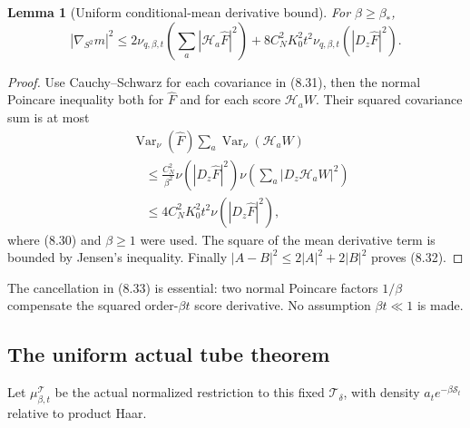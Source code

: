 \documentclass[11pt,oneside]{article}
\newtheorem{lemma}[theorem]{Lemma}
\DeclareMathOperator{\Var}{Var}
\newcommand{\cS}{\mathcal S}
\newcommand{\cT}{\mathcal T}
\begin{document}
\begin{lemma}[Uniform conditional-mean derivative bound]
\label{lem:f13v3-mean}
For \(\beta\ge\beta_*\),
\[
 |\nabla_{S^2}m|^2
 \le 2\nu_{q,\beta,t}
                  \left(\sum_a|\mathcal H_a\widehat F|^2\right)
       +8C_N^2K_0^2t^2
                    \nu_{q,\beta,t}(|D_z\widehat F|^2).
 \tag{8.32}
\]
\end{lemma}
\begin{proof}
Use Cauchy--Schwarz for each
covariance in (8.31), then
the normal Poincare inequality
both for \(\widehat F\) and
for each score \(\mathcal H_aW\).
Their squared covariance sum
is at most
\[
 \begin{split}
 &\Var_\nu(\widehat F)\sum_a
                           \Var_\nu(\mathcal H_aW)\\
 &\quad\le
 \frac{C_N^2}{\beta^2}
       \nu(|D_z\widehat F|^2)
             \nu\!\left(\sum_a|D_z\mathcal H_aW|^2\right)\\
 &\quad\le
       4C_N^2K_0^2t^2\nu(|D_z\widehat F|^2),
 \end{split}
 \tag{8.33}
\]
where (8.30) and \(\beta\ge1\)
were used. The square of the
mean derivative term is
bounded by Jensen's inequality.
Finally \(|A-B|^2\le2|A|^2+2|B|^2\)
proves (8.32).
\end{proof}

The cancellation in (8.33)
is essential: two normal
Poincare factors \(1/\beta\)
compensate the squared
order-\(\beta t\) score
derivative. No assumption
\(\beta t\ll1\) is made.

\subsection{The uniform actual tube theorem}

Let \(\mu_{\beta,t}^{\cT}\)
be the actual normalized
restriction to this fixed
\(\cT_\delta\), with density
\(a_t e^{-\beta\cS_t}\)
relative to product Haar.
\end{document}

